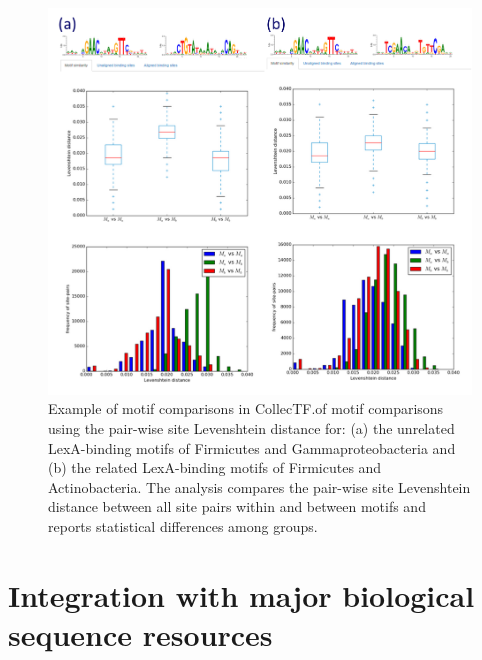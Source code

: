 \begin{figure}
  \centering
  \includegraphics[width=\textwidth]{figures/chapter2/motif-comparison}
  \caption{Example of motif comparisons in CollecTF.\@Results of motif
    comparisons using the pair-wise site Levenshtein distance for: (a) the
    unrelated LexA-binding motifs of Firmicutes and Gammaproteobacteria and (b)
    the related LexA-binding motifs of Firmicutes and Actinobacteria. The
    analysis compares the pair-wise site Levenshtein distance between all site
    pairs within and between motifs and reports statistical differences among
    groups.}
\label{fig:motif-comparison}
\end{figure}

\section{Integration with major biological sequence resources}

